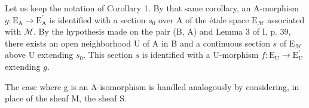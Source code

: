Let us keep the notation of Corollary 1. By that same corollary, an A-morphism \(g \colon \mathrm{E}_{\mathrm{A}} \to \mathrm{E}_{\mathrm{A}}^{\prime}\) is identified with a section \(s_0\) over A of the étale space \(\mathrm{E}_{\mathcal{M}}\) associated with \(\mathcal{M}\). By the hypothesis made on the pair (B, A) and Lemma 3 of I, p. 39, there exists an open neighborhood U of A in B and a continuous section \(s\) of \(\mathrm{E}_{\mathcal{M}}\) above U extending \(s_0\). This section \(s\) is identified with a U-morphism \(f \colon \mathrm{E}_{\mathrm{U}} \to \mathrm{E}_{\mathrm{U}}^{\prime}\) extending \(g\).

The case where g is an A-isomorphism is handled analogously by considering, in place of the sheaf M, the sheaf S.

